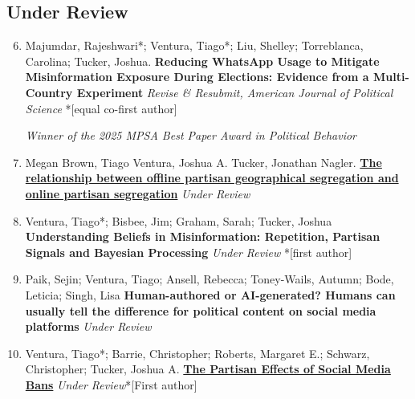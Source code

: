 \documentclass[letterpaper, 11pt]{article}
\newenvironment{benumerate}[1]{
    \let\oldItem\item
    \def\item{\addtocounter{enumi}{-2}\oldItem}
    \begin{enumerate}[leftmargin=2em]
    \setcounter{enumi}{#1}
    \addtocounter{enumi}{1}
}{
    \end{enumerate}
}
\begin{document}
\subsection*{Under Review}
    \begin{benumerate}{5}

       \item Majumdar, Rajeshwari*; Ventura, Tiago*; Liu, Shelley; Torreblanca, Carolina; Tucker, Joshua. \textbf{Reducing WhatsApp Usage to Mitigate Misinformation Exposure During Elections: Evidence from a Multi-Country Experiment} \textit{Revise \& Resubmit, American Journal of Political Science} *[equal co-first author]

       \subitem \textit{Winner of the 2025 MPSA Best Paper Award in Political Behavior}

        \item  Megan Brown, Tiago Ventura, Joshua A. Tucker, Jonathan Nagler. \href{https://arxiv.org/abs/2512.07121}{\textbf{The relationship between offline partisan geographical segregation and online partisan segregation}}  \textit{Under Review}

        \item Ventura, Tiago*; Bisbee, Jim; Graham, Sarah; Tucker, Joshua \textbf{Understanding Beliefs in Misinformation: Repetition, Partisan Signals and Bayesian Processing} \textit{Under Review} *[first author]

        \item Paik, Sejin; Ventura, Tiago; Ansell, Rebecca; Toney-Wails, Autumn; Bode, Leticia;  Singh, Lisa \textbf{Human-authored or AI-generated? Humans can usually tell the difference for political content on social media platforms} \textit{Under Review}

        \item Ventura, Tiago*; Barrie, Christopher; Roberts, Margaret E.; Schwarz, Christopher; Tucker, Joshua A. \href{https://osf.io/preprints/socarxiv/4stfw_v1}{\textbf{The Partisan Effects of Social Media Bans}} \textit{Under Review}*[First author]



        \end{benumerate}
\end{document}
